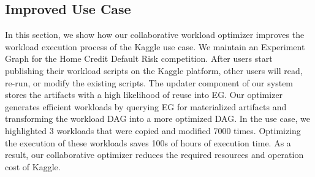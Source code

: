 
\subsection{Improved Use Case}
In this section, we show how our collaborative workload optimizer improves the workload execution process of the Kaggle use case.
We maintain an Experiment Graph for the Home Credit Default Risk competition.
After users start publishing their workload scripts on the Kaggle platform, other users will read, re-run, or modify the existing scripts.
The updater component of our system stores the artifacts with a high likelihood of reuse into EG.
Our optimizer generates efficient workloads by querying EG for materialized artifacts and transforming the workload DAG into a more optimized DAG.
In the use case, we highlighted 3 workloads that were copied and modified 7000 times.
Optimizing the execution of these workloads saves 100s of hours of execution time.
As a result, our collaborative optimizer reduces the required resources and operation cost of Kaggle.

